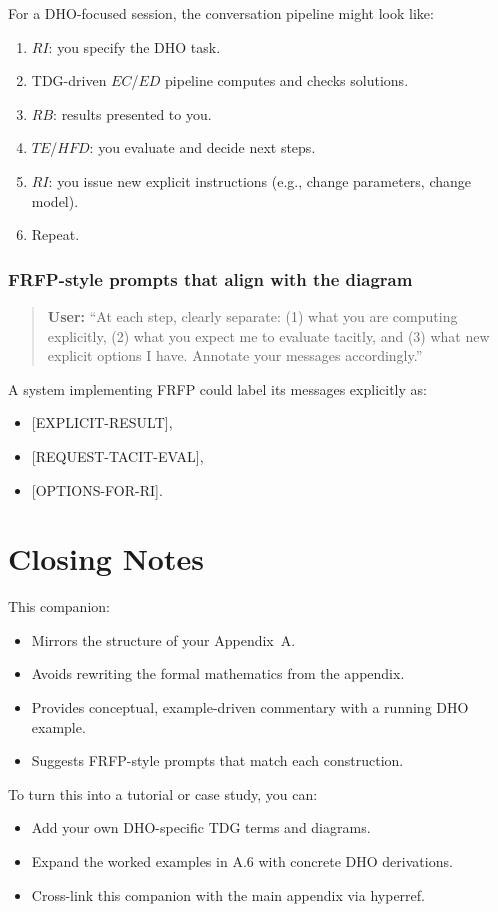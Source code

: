 For a DHO-focused session, the conversation pipeline might look like:

\begin{enumerate}
 \item $RI$: you specify the DHO task.
 \item TDG-driven $EC$/$ED$ pipeline computes and checks solutions.
 \item $RB$: results presented to you.
 \item $TE$/$HFD$: you evaluate and decide next steps.
 \item $RI$: you issue new explicit instructions (e.g., change parameters, change model).
 \item Repeat.
\end{enumerate}

\subsubsection*{FRFP-style prompts that align with the diagram}

\begin{quote}
\textbf{User:} 
``At each step, clearly separate: (1) what you are computing explicitly, (2) what you expect me to evaluate tacitly, and (3) what new explicit options I have. 
Annotate your messages accordingly.'' 
\end{quote}

A system implementing FRFP could label its messages explicitly as:

\begin{itemize}
 \item \textsf{[EXPLICIT-RESULT]},
 \item \textsf{[REQUEST-TACIT-EVAL]},
 \item \textsf{[OPTIONS-FOR-RI]}.
\end{itemize}

\newpage

\section*{Closing Notes}

This companion:

\begin{itemize}
 \item Mirrors the structure of your Appendix~A.
 \item Avoids rewriting the formal mathematics from the appendix.
 \item Provides conceptual, example-driven commentary with a running DHO example.
 \item Suggests FRFP-style prompts that match each construction.
\end{itemize}

To turn this into a tutorial or case study, you can:

\begin{itemize}
 \item Add your own DHO-specific TDG terms and diagrams.
 \item Expand the worked examples in A.6 with concrete DHO derivations.
 \item Cross-link this companion with the main appendix via hyperref.
\end{itemize}
